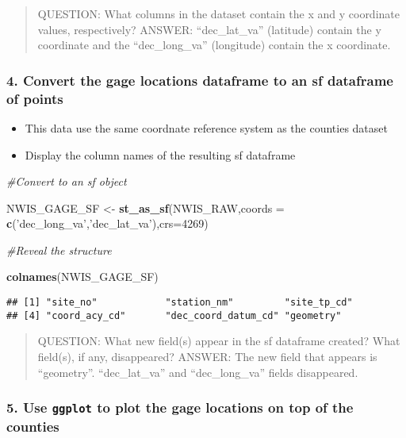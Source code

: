 \documentclass[]{article}
\newenvironment{Shaded}{\begin{snugshade}}{\end{snugshade}}
\newcommand{\KeywordTok}[1]{\textcolor[rgb]{0.13,0.29,0.53}{\textbf{#1}}}
\newcommand{\DataTypeTok}[1]{\textcolor[rgb]{0.13,0.29,0.53}{#1}}
\newcommand{\DecValTok}[1]{\textcolor[rgb]{0.00,0.00,0.81}{#1}}
\newcommand{\StringTok}[1]{\textcolor[rgb]{0.31,0.60,0.02}{#1}}
\newcommand{\CommentTok}[1]{\textcolor[rgb]{0.56,0.35,0.01}{\textit{#1}}}
\newcommand{\NormalTok}[1]{#1}
\providecommand{\tightlist}{%
  \setlength{\itemsep}{0pt}\setlength{\parskip}{0pt}}
\begin{document}
\begin{quote}
QUESTION: What columns in the dataset contain the x and y coordinate
values, respectively? ANSWER: ``dec\_lat\_va'' (latitude) contain the y
coordinate and the ``dec\_long\_va'' (longitude) contain the x
coordinate.
\end{quote}

\subsubsection{4. Convert the gage locations dataframe to an sf
dataframe of
points}\label{convert-the-gage-locations-dataframe-to-an-sf-dataframe-of-points}

\begin{itemize}
\tightlist
\item
  This data use the same coordnate reference system as the counties
  dataset
\item
  Display the column names of the resulting sf dataframe
\end{itemize}

\begin{Shaded}
\begin{Highlighting}[]
\CommentTok{#Convert to an sf object}

\NormalTok{NWIS_GAGE_SF <-}\StringTok{ }\KeywordTok{st_as_sf}\NormalTok{(NWIS_RAW,}\DataTypeTok{coords =} \KeywordTok{c}\NormalTok{(}\StringTok{'dec_long_va'}\NormalTok{,}\StringTok{'dec_lat_va'}\NormalTok{),}\DataTypeTok{crs=}\DecValTok{4269}\NormalTok{)}

\CommentTok{#Reveal the structure}

\KeywordTok{colnames}\NormalTok{(NWIS_GAGE_SF)}
\end{Highlighting}
\end{Shaded}

\begin{verbatim}
## [1] "site_no"            "station_nm"         "site_tp_cd"        
## [4] "coord_acy_cd"       "dec_coord_datum_cd" "geometry"
\end{verbatim}

\begin{quote}
QUESTION: What new field(s) appear in the sf dataframe created? What
field(s), if any, disappeared? ANSWER: The new field that appears is
``geometry''. ``dec\_lat\_va'' and ``dec\_long\_va'' fields disappeared.
\end{quote}

\subsubsection{\texorpdfstring{5. Use \texttt{ggplot} to plot the gage
locations on top of the
counties}{5. Use ggplot to plot the gage locations on top of the counties}}\label{use-ggplot-to-plot-the-gage-locations-on-top-of-the-counties}
\end{document}
